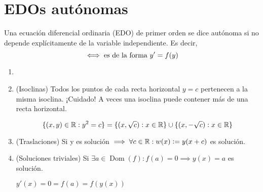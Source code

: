 \section{EDOs autónomas}

\begin{defn}
    Una ecuación diferencial ordinaria (EDO) de primer orden se dice autónoma si no depende explícitamente de la variable independiente. Es decir, 
    \[\iff \text{es de la forma } y'=f(y)\]
\end{defn}

\begin{prop}
    \begin{enumerate}
        \item[]
        \item (Isoclinas) Todos los puntos de cada recta horizontal $y=c$ pertenecen a la misma isoclina. ¡Cuidado! A veces una isoclina puede contener más de una recta horizontal.
        \begin{ejem}[$y'=y^2$]
            \[\{(x,y)\in \mathbb{R}:y^2=c\}=\{(x,\sqrt{c}):x\in\mathbb{R}\}\cup\{(x,-\sqrt{c}):x\in\mathbb{R}\}\]
        \end{ejem}
        \item (Traslaciones) Si y es solución $\implies \forall c \in \mathbb{R} : w(x)\vcentcolon= y(x+c)$ es solución.
        \item (Soluciones triviales) Si $\exists a \in \operatorname{Dom}(f) : f(a)=0 \implies y(x)=a$ es solución.
        \begin{dem}
            $y'(x)=0=f(a)=f(y(x))$
        \end{dem}
    \end{enumerate}
\end{prop}

